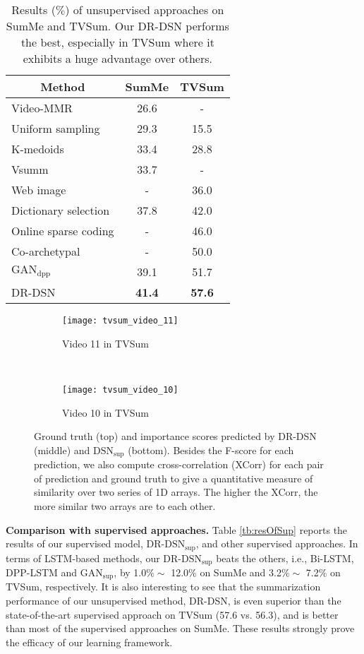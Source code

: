 \documentclass[letterpaper]{article} \usepackage{aaai18}  \usepackage{times}  \usepackage{helvet}  \usepackage{courier}  \usepackage{url}  \usepackage{graphicx}
\begin{document}
\begin{table}[h]
\centering
\caption{Results ($\%$) of unsupervised approaches on SumMe and TVSum. Our DR-DSN performs the best, especially in TVSum where it exhibits a huge advantage over others.}
\label{tb:resOfUnsup}
\begin{tabular}{l | c | c}
\hline
\multicolumn{1}{c|}{Method} & SumMe & TVSum \\
\hline
Video-MMR & 26.6 & - \\
Uniform sampling & 29.3 & 15.5 \\
K-medoids & 33.4 & 28.8 \\
Vsumm & 33.7 & - \\
Web image & - & 36.0 \\
Dictionary selection & 37.8 & 42.0 \\
Online sparse coding & - & 46.0 \\
Co-archetypal & - & 50.0 \\
$\text{GAN}_\text{dpp}$ & 39.1 & 51.7 \\
\hline \hline
DR-DSN & {\bf 41.4} & {\bf 57.6} \\
\hline
\end{tabular}
\end{table}

\begin{figure*}[h]
\centering
  \begin{subfigure}[b]{0.49\textwidth}
  \texttt{[image: tvsum\_video\_11]}
  \caption{Video 11 in TVSum} \label{fig:tvsum_video_11}
  \end{subfigure}
  ~
  \begin{subfigure}[b]{0.49\textwidth}
  \texttt{[image: tvsum\_video\_10]}
  \caption{Video 10 in TVSum} \label{fig:tvsum_video_10}
  \end{subfigure}
\caption{Ground truth (top) and importance scores predicted by DR-DSN (middle) and $\text{DSN}_\text{sup}$ (bottom). Besides the F-score for each prediction, we also compute cross-correlation (XCorr) for each pair of prediction and ground truth to give a quantitative measure of similarity over two series of 1D arrays. The higher the XCorr, the more similar two arrays are to each other.}
\label{fig:IS_tvsum_videos}
\end{figure*}

{\bf Comparison with supervised approaches.} Table \ref{tb:resOfSup} reports the results of our supervised model, $\text{DR-DSN}_\text{sup}$, and other supervised approaches. In terms of LSTM-based methods, our $\text{DR-DSN}_\text{sup}$ beats the others, i.e., Bi-LSTM, DPP-LSTM and $\text{GAN}_\text{sup}$, by 1.0$\% \sim$ 12.0$\%$ on SumMe and 3.2$\% \sim$ 7.2$\%$ on TVSum, respectively. It is also interesting to see that the summarization performance of our unsupervised method, DR-DSN, is even superior than the state-of-the-art supervised approach on TVSum (57.6 vs. 56.3), and is better than most of the supervised approaches on SumMe. These results strongly prove the efficacy of our learning framework.
\end{document}
